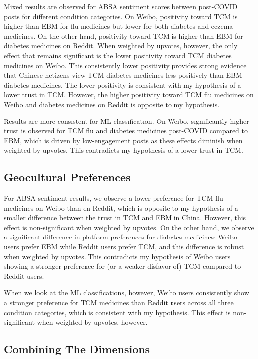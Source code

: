 \documentclass[11pt]{article}
\begin{document}
Mixed results are observed for ABSA sentiment scores between post-COVID posts for different condition categories. On Weibo, positivity toward TCM is higher than EBM for flu medicines but lower for both diabetes and eczema medicines. On the other hand, positivity toward TCM is higher than EBM for diabetes medicines on Reddit. When weighted by upvotes, however, the only effect that remains significant is the lower positivity toward TCM diabetes medicines on Weibo. This consistently lower positivity provides strong evidence that Chinese netizens view TCM diabetes medicines less positively than EBM diabetes medicines. The lower positivity is consistent with my hypothesis of a lower trust in TCM. However, the higher positivity toward TCM flu medicines on Weibo and diabetes medicines on Reddit is opposite to my hypothesis.

Results are more consistent for ML classification. On Weibo, significantly higher trust is observed for TCM flu and diabetes medicines post-COVID compared to EBM, which is driven by low-engagement posts as these effects diminish when weighted by upvotes. This contradicts my hypothesis of a lower trust in TCM.

\subsection{Geocultural Preferences}

For ABSA sentiment results, we observe a lower preference for TCM flu medicines on Weibo than on Reddit, which is opposite to my hypothesis of a smaller difference between the trust in TCM and EBM in China. However, this effect is non-significant when weighted by upvotes. On the other hand, we observe a significant difference in platform preferences for diabetes medicines: Weibo users prefer EBM while Reddit users prefer TCM, and this difference is robust when weighted by upvotes. This contradicts my hypothesis of Weibo users showing a stronger preference for (or a weaker disfavor of) TCM compared to Reddit users.

When we look at the ML classifications, however, Weibo users consistently show a stronger preference for TCM medicines than Reddit users across all three condition categories, which is consistent with my hypothesis. This effect is non-significant when weighted by upvotes, however.

\subsection{Combining The Dimensions}
\end{document}
